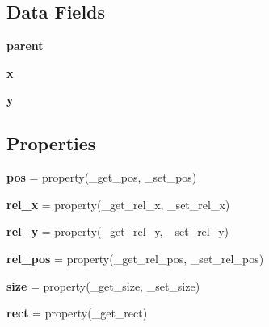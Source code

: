 \subsection*{Data Fields}
\begin{DoxyCompactItemize}
\item 
\hypertarget{classUI_1_1UIObject_a0ca2ea83453a41066c5e606952266e9a}{{\bfseries parent}}\label{classUI_1_1UIObject_a0ca2ea83453a41066c5e606952266e9a}

\item 
\hypertarget{classUI_1_1UIObject_a0a9fe60c4e321830baa54329192f0931}{{\bfseries x}}\label{classUI_1_1UIObject_a0a9fe60c4e321830baa54329192f0931}

\item 
\hypertarget{classUI_1_1UIObject_a7e9a5c2f43265a757d4c90089e58a8e5}{{\bfseries y}}\label{classUI_1_1UIObject_a7e9a5c2f43265a757d4c90089e58a8e5}

\end{DoxyCompactItemize}
\subsection*{Properties}
\begin{DoxyCompactItemize}
\item 
\hypertarget{classUI_1_1UIObject_ad1f2cc2a5531c13ff9a7627b2218a1a0}{{\bfseries pos} = property(\-\_\-get\-\_\-pos, \-\_\-set\-\_\-pos)}\label{classUI_1_1UIObject_ad1f2cc2a5531c13ff9a7627b2218a1a0}

\item 
\hypertarget{classUI_1_1UIObject_a9558ebeab6d04876a9ad0ac629622452}{{\bfseries rel\-\_\-x} = property(\-\_\-get\-\_\-rel\-\_\-x, \-\_\-set\-\_\-rel\-\_\-x)}\label{classUI_1_1UIObject_a9558ebeab6d04876a9ad0ac629622452}

\item 
\hypertarget{classUI_1_1UIObject_ac5225d93c0951e718a9e966bc1ada531}{{\bfseries rel\-\_\-y} = property(\-\_\-get\-\_\-rel\-\_\-y, \-\_\-set\-\_\-rel\-\_\-y)}\label{classUI_1_1UIObject_ac5225d93c0951e718a9e966bc1ada531}

\item 
\hypertarget{classUI_1_1UIObject_a2b7d8794830d49093f05e017ca23768f}{{\bfseries rel\-\_\-pos} = property(\-\_\-get\-\_\-rel\-\_\-pos, \-\_\-set\-\_\-rel\-\_\-pos)}\label{classUI_1_1UIObject_a2b7d8794830d49093f05e017ca23768f}

\item 
\hypertarget{classUI_1_1UIObject_aa51a72c7559fed4f260b192a12e6805c}{{\bfseries size} = property(\-\_\-get\-\_\-size, \-\_\-set\-\_\-size)}\label{classUI_1_1UIObject_aa51a72c7559fed4f260b192a12e6805c}

\item 
\hypertarget{classUI_1_1UIObject_a72e5ff37f9a27451cc7a586fa43fdb9c}{{\bfseries rect} = property(\-\_\-get\-\_\-rect)}\label{classUI_1_1UIObject_a72e5ff37f9a27451cc7a586fa43fdb9c}

\end{DoxyCompactItemize}


